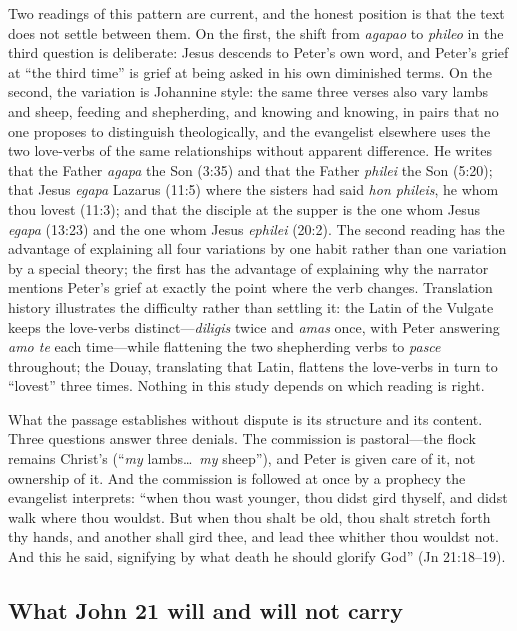 Two readings of this pattern are current, and the honest position is that the
text does not settle between them. On the first, the shift from
\textit{agapao} to \textit{phileo} in the third question is deliberate: Jesus
descends to Peter's own word, and Peter's grief at ``the third time'' is
grief at being asked in his own diminished terms. On the second, the
variation is Johannine style: the same three verses also vary lambs and
sheep, feeding and shepherding, and knowing and knowing, in pairs that no one
proposes to distinguish theologically, and the evangelist elsewhere uses the
two love-verbs of the same relationships without apparent difference. He
writes that the Father \textit{agapa} the Son (3:35) and that the Father
\textit{philei} the Son (5:20); that Jesus \textit{egapa} Lazarus (11:5)
where the sisters had said \textit{hon phileis}, he whom thou lovest (11:3);
and that the disciple at the supper is the one whom Jesus
\textit{egapa} (13:23) and the one whom Jesus \textit{ephilei} (20:2). The
second reading has the advantage of
explaining all four variations by one habit rather than one variation by a
special theory; the first has the advantage of explaining why the narrator
mentions Peter's grief at exactly the point where the verb changes.
Translation history illustrates the difficulty rather than settling it: the
Latin of the Vulgate keeps the love-verbs distinct---\textit{diligis} twice
and \textit{amas} once, with Peter answering \textit{amo te} each time---while
flattening the two shepherding verbs to \textit{pasce} throughout; the Douay,
translating that Latin, flattens the love-verbs in turn to ``lovest'' three
times. Nothing in this study depends on which reading is right.

What the passage establishes without dispute is its structure and its
content. Three questions answer three denials. The commission is
pastoral---the flock remains Christ's (``\emph{my} lambs\ldots\ \emph{my}
sheep''), and Peter is given care of it, not ownership of it. And the
commission is followed at once by a prophecy the evangelist interprets:
``when thou wast younger, thou didst gird thyself, and didst walk where thou
wouldst. But when thou shalt be old, thou shalt stretch forth thy hands, and
another shall gird thee, and lead thee whither thou wouldst not. And this he
said, signifying by what death he should glorify God'' (Jn 21:18--19).

\subsection{What John 21 will and will not carry}


